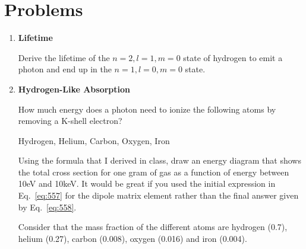 \section{Problems}
\begin{enumerate}
\item{\bf Lifetime}

Derive the lifetime of the $n=2, l=1, m=0$ state of hydrogen to emit a
photon and end up in the $n=1, l=0, m=0$ state.


\item{\bf Hydrogen-Like Absorption}

How much energy does a photon need to ionize the following atoms by
removing a K-shell electron?  

Hydrogen, Helium, Carbon, Oxygen, Iron

Using the formula that I derived in class, draw an energy diagram that
shows the total cross section for one gram of gas as a function of
energy between 10eV and 10keV.   It would be great if you used the
initial expression in Eq.~\ref{eq:557} for the dipole matrix element rather
than the final answer given by Eq.~\ref{eq:558}.

Consider that the mass fraction of the different atoms are hydrogen
(0.7), helium (0.27), carbon (0.008), oxygen (0.016) and iron (0.004).


\end{enumerate}
